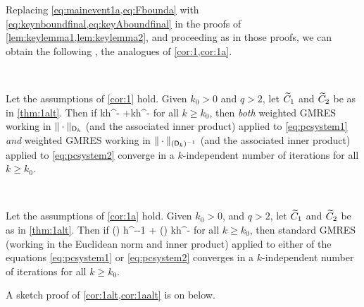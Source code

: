 Replacing \cref{eq:mainevent1a,eq:Fbounda} with \cref{eq:keynboundfinal,eq:keyAboundfinal} in the proofs of \cref{lem:keylemma1,lem:keylemma2}, and proceeding as in those proofs, we can obtain the following , the analogues of \cref{cor:1,cor:1a}.

\label{cor:1alt}

\

\noindent Let the assumptions of \cref{cor:1} hold.  Given $k_0>0$ and $q >2$, let $\widetilde{C}_{1}$ and $\widetilde{C}_{2}$ be as in \cref{thm:1alt}. Then if 
\beq\label{eq:condalt}
\Cotilde kh^{-} \NLqDop{\Aso-\Ast} +\Cttilde  kh^{-} \NLqDRR{\nso-\nst}
\leq {}
\eeq
for all $k\geq k_0$, then \emph{both} weighted GMRES working in $\|\cdot\|_{\mathsf{D}_k}$ (and the associated inner product) applied to \cref{eq:pcsystem1} \emph{and} weighted GMRES working in $\|\cdot\|_{(\mathsf{D}_k)^{-1}}$ (and the associated inner product) applied to \cref{eq:pcsystem2}  converge in a $k$-independent number of iterations for all $k\geq k_0$.
\enth

\label{cor:1aalt}

\

\noindent Let the assumptions of \cref{cor:1a} hold.  Given $k_0>0$, and $q >2$, let $\widetilde{C}_{1}$ and $\widetilde{C}_{2}$ be as in \cref{thm:1alt}. Then if 
\beq\label{eq:condaalt}
\Cotilde \mleft(\frac{\splus}{\mminus}\mright) h^{--1} \NLqDop{\Aso-\Ast} + \Cttilde \mleft(\frac{\mplus}{\mminus}\mright) kh^{-} \NLqDRR{\nso-\nst} \leq \half
\eeq
for all $k\geq k_0$, then standard GMRES (working in the Euclidean norm and inner product) applied to either of the equations \cref{eq:pcsystem1} or \cref{eq:pcsystem2}
 converges in a $k$-independent number of iterations for all $k\geq k_0$.
 \enth

 A sketch proof of \cref{cor:1alt,cor:1aalt} is on  below.

